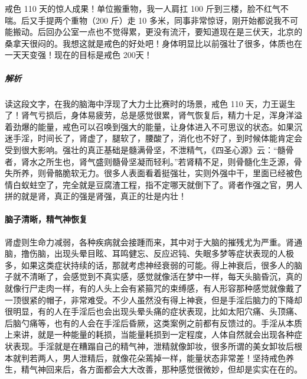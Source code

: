\begin{case}
    戒色 110 天的惊人成果！单位搬重物，我一人肩扛 100 斤到三楼，脸不红气不喘。后又手提两个重物（200 斤）走 10 多米，同事非常惊讶，刚开始都说我不可能搬动。后回办公室一点也不觉得累，更没有流汗，要知道现在是三伏天，北京的桑拿天很闷的。我想这就是戒色的好处吧！身体明显比以前强壮了很多，体质也在一天天变强！现在的目标是戒色 200天！
    \subparagraph{解析} 读这段文字，在我的脑海中浮现了大力士比赛时的场景，戒色 110 天，力王诞生了！肾气亏损后，身体易疲劳，总是感觉很累，肾气恢复后，精力十足，浑身洋溢着劲爆的能量，戒色可以召唤到强大的能量，让身体进入不可思议的状态。如果沉迷手淫，时间长了，肾虚了，腿软了，腰酸了，消化也不好了，到时候体能肯定会受到很大影响。强壮的真正基础是髓满骨坚，不泄精气，《四圣心源》云：“髓骨者，肾水之所生也，肾气盛则髓骨坚凝而轻利。”若肾精不足，则骨髓化生乏源，骨失所养，则骨骼脆软无力。很多人表面看着挺强壮，实则外强中干，里面已经被色情白蚁蛀空了，完全就是豆腐渣工程，指不定哪天就倒下了。肾者作强之官，男人拼的就是肾，真正的强是肾强，真正的壮是内壮！
\end{case}

\paragraph{脑子清晰，精气神恢复}

肾虚则生命力减弱，各种疾病就会接踵而来，其中对于大脑的摧残尤为严重。肾通脑，撸伤脑，出现头晕目眩、耳鸣健忘、反应迟钝、失眠多梦等症状表现的人极多，如果这类症状持续的话，那就考虑神经衰弱的可能。得上神衰后，很多人的脑子就不清晰了，会感觉到不真实感，感觉就像活在梦中一样，每天头脑昏沉，真的就像行尸走肉一样，有的人头上会有紧箍咒的束缚感，有人形容那种感觉就像戴了一顶很紧的帽子，非常难受。不少人虽然没有得上神衰，但是手淫后脑力的下降却很明显，有的人在手淫后也会出现头晕头痛的症状表现，比如太阳穴痛、头顶痛、后脑勺痛等，也有的人会在手淫后昏厥，这类案例之前都有反馈过的。手淫从本质上来讲，就是一种能量的耗损，当能量耗损到一定程度，人体自然就会出现各种症状表现。手淫就是在糟蹋自己的精气神，泄精就像卸妆，很多所谓的美女卸妆后根本就判若两人，男人泄精后，就像花朵蔫掉一样，能量状态非常差！坚持戒色养生，精气神回来后，各方面都会大大改善，那种感觉很微妙，但却是实实在在的。

